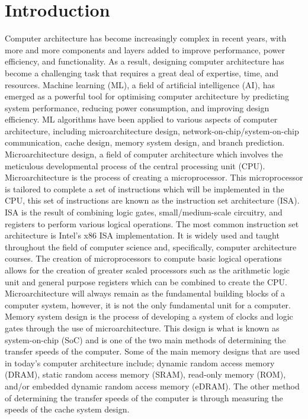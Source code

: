 \documentclass[conference]{IEEEtran}
\begin{document}
\section{Introduction}
Computer architecture has become increasingly complex in recent years, with more and more components 
and layers added to improve performance, power efficiency, and functionality. As a result, designing 
computer architecture has become a challenging task that requires a great deal of expertise, time, 
and resources. Machine learning (ML), a field of artificial intelligence (AI), has emerged as a powerful tool for 
optimising computer architecture by predicting system performance, reducing power consumption, and improving 
design efficiency. ML algorithms have been applied to various aspects of computer architecture, 
including microarchitecture design, network-on-chip/system-on-chip communication, cache design, memory system design, 
and branch prediction. Microarchitecture design, a field of computer architecture which involves the meticulous 
developmental process of the central processing unit (CPU). Microarchitecture is the process of creating a 
microprocessor. This microprocessor is tailored to complete a set of instructions which will be implemented in the 
CPU, this set of instructions are known as the instruction set architecture (ISA). ISA is the result of combining 
logic gates, small/medium-scale circuitry, and registers to perform various logical operations. The most common 
instruction set architecture is Intel's x86 ISA implementation. It is widely used and taught throughout 
the field of computer science and, specifically, computer architecture courses. The creation of microprocessors to 
compute basic logical operations allows for the creation of greater scaled processors such as the arithmetic logic 
unit and general purpose registers which can be combined to create the CPU. Microarchitecture will always remain 
as the fundamental building blocks of a computer system, however, it is not the only fundamental unit for a computer.
Memory system design is the process of developing a system of clocks and logic gates through the use of microarchitecture.
This design is what is known as system-on-chip (SoC) and is one of the two main methods of determining the transfer speeds of 
the computer. Some of the main memory designs that are used in today's computer architecture include; dynamic random access 
memory (DRAM), static random access memory (SRAM), read-only memory (ROM), and/or embedded dynamic random access memory (eDRAM).
The other method of determining the transfer speeds of the computer is through measuring the speeds of the cache system design.
\end{document}
